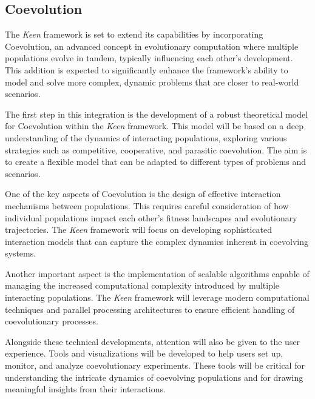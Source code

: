         \subsection{Coevolution}
        \label{sec:future:coev}
            The \textit{Keen} framework is set to extend its capabilities by incorporating Coevolution, an advanced 
            concept in evolutionary computation where multiple populations evolve in tandem, typically influencing each 
            other's development. This addition is expected to significantly enhance the framework's ability to model and 
            solve more complex, dynamic problems that are closer to real-world scenarios.
        
            The first step in this integration is the development of a robust theoretical model for Coevolution within 
            the \textit{Keen} framework. This model will be based on a deep understanding of the dynamics of interacting 
            populations, exploring various strategies such as competitive, cooperative, and parasitic coevolution. The 
            aim is to create a flexible model that can be adapted to different types of problems and scenarios.
        
            One of the key aspects of Coevolution is the design of effective interaction mechanisms between populations. 
            This requires careful consideration of how individual populations impact each other's fitness landscapes and 
            evolutionary trajectories. The \textit{Keen} framework will focus on developing sophisticated interaction 
            models that can capture the complex dynamics inherent in coevolving systems.
        
            Another important aspect is the implementation of scalable algorithms capable of managing the increased 
            computational complexity introduced by multiple interacting populations. The \textit{Keen} framework will 
            leverage modern computational techniques and parallel processing architectures to ensure efficient handling 
            of coevolutionary processes.
        
            Alongside these technical developments, attention will also be given to the user experience. Tools and 
            visualizations will be developed to help users set up, monitor, and analyze coevolutionary experiments. 
            These tools will be critical for understanding the intricate dynamics of coevolving populations and for 
            drawing meaningful insights from their interactions.
        
